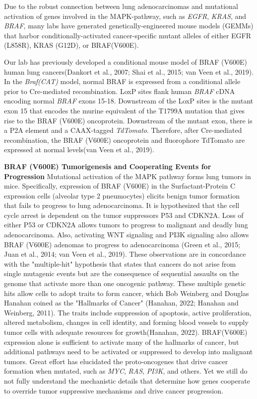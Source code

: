 Due to the robust connection between lung adenocarcinomas and mutational activation of genes involved in the MAPK-pathway, such as \emph{EGFR}, \emph{KRAS}, and \emph{BRAF}, many labs have generated genetically-engineered mouse models (GEMMs) that harbor conditionally-activated cancer-specific mutant alleles of either EGFR (L858R), KRAS (G12D), or BRAF(V600E).

Our lab has previously developed a conditional mouse model of BRAF (V600E) human lung cancers(Dankort et al., 2007; Shai et al., 2015; van Veen et al., 2019). In the \emph{Braf(CAT)} model, normal BRAF is expressed from a conditional allele prior to Cre-mediated recombination. LoxP sites flank human \emph{BRAF} cDNA encoding normal \emph{BRAF} exons 15-18. Downstream of the LoxP sites is the mutant exon 15 that encodes the murine equivalent of the T1799A mutation that gives rise to the BRAF (V600E) oncoprotein. Downstream of the mutant exon, there is a P2A element and a CAAX-tagged \emph{TdTomato}. Therefore, after Cre-mediated recombination, the BRAF (V600E) oncoprotein and fluorophore TdTomato are expressed at normal levels(van Veen et al., 2019).

\textbf{BRAF (V600E) Tumorigenesis and Cooperating Events for Progression} Mutational activation of the MAPK pathway forms lung tumors in mice. Specifically, expression of BRAF (V600E) in the Surfactant-Protein C expression cells (alveolar type 2 pneumocytes) elicits benign tumor formation that fails to progress to lung adenocarcinoma. It is hypothesized that the cell cycle arrest is dependent on the tumor suppressors P53 and CDKN2A. Loss of either P53 or CDKN2A allows tumors to progress to malignant and deadly lung adenocarcinoma. Also, activating WNT signaling and PI3K signaling also allows BRAF (V600E) adenomas to progress to adenocarcinoma (Green et al., 2015; Juan et al., 2014; van Veen et al., 2019). These observations are in concordance with the "multiple-hit" hypothesis that states that cancers do not arise from single mutagenic events but are the consequence of sequential assaults on the genome that activate more than one oncogenic pathway. These multiple genetic hits allow cells to adopt traits to form cancer, which Bob Weinberg and Douglas Hanahan coined as the "Hallmarks of Cancer" (Hanahan, 2022; Hanahan and Weinberg, 2011). The traits include suppression of apoptosis, active proliferation, altered metabolism, changes in cell identity, and forming blood vessels to supply tumor cells with adequate resources for growth(Hanahan, 2022). BRAF(V600E) expression alone is sufficient to activate many of the hallmarks of cancer, but additional pathways need to be activated or suppressed to develop into malignant tumors. Great effort has elucidated the proto-oncogenes that drive cancer formation when mutated, such as \emph{MYC}, \emph{RAS}, \emph{PI3K}, and others. Yet we still do not fully understand the mechanistic details that determine how genes cooperate to override tumor suppressive mechanisms and drive cancer progression.

